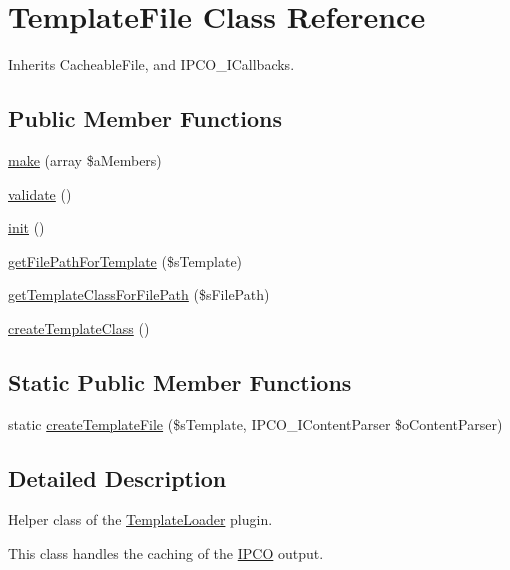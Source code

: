 \hypertarget{class_template_file}{\section{Template\-File Class Reference}
\label{class_template_file}
}


Inherits Cacheable\-File, and I\-P\-C\-O\-\_\-\-I\-Callbacks.

\subsection*{Public Member Functions}
\begin{DoxyCompactItemize}
\item 
\hyperlink{class_template_file_aa36f590b760493569c9c9349915ba6a2}{make} (array \$a\-Members)
\item 
\hyperlink{class_template_file_ab7ea2154b976b6d4eee1b59254cfc171}{validate} ()
\item 
\hyperlink{class_template_file_a478b5bc21a13b8557a981ba723af8f33}{init} ()
\item 
\hyperlink{class_template_file_a9b8d7aa0b8464b97897333ec08931aea}{get\-File\-Path\-For\-Template} (\$s\-Template)
\item 
\hyperlink{class_template_file_a1d9196fa579b962fb725833326d4fa28}{get\-Template\-Class\-For\-File\-Path} (\$s\-File\-Path)
\item 
\hyperlink{class_template_file_ad6ded534b21256f5c40f02d19504bcaf}{create\-Template\-Class} ()
\end{DoxyCompactItemize}
\subsection*{Static Public Member Functions}
\begin{DoxyCompactItemize}
\item 
static \hyperlink{class_template_file_ad40fa812d27ae5ee64c2ae49dc98f10d}{create\-Template\-File} (\$s\-Template, I\-P\-C\-O\-\_\-\-I\-Content\-Parser \$o\-Content\-Parser)
\end{DoxyCompactItemize}


\subsection{Detailed Description}
Helper class of the \hyperlink{class_template_loader}{Template\-Loader} plugin.

This class handles the caching of the \hyperlink{class_i_p_c_o}{I\-P\-C\-O} output.

